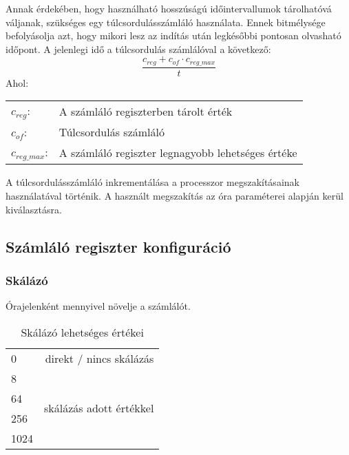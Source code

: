 Annak érdekében, hogy használható hosszúságú időintervallumok tárolhatóvá váljanak, szükséges egy túlcsordulásszámláló használata.
Ennek bitmélysége befolyásolja azt, hogy mikori lesz az indítás után legkésőbbi pontosan olvasható időpont.
A jelenlegi idő a túlcsordulás számlálóval a következő:
\begin{equation}
    \frac{c_{reg} + c_{of} \cdot c_{reg\_max}}{t}
    \label{eq:ido_szamlalokbol}
\end{equation}
Ahol:
\captionsetup[table]{list=no}
\begin{table}[H]
    \begin{tabular}{ll}
    $c_{reg}$:&A számláló regiszterben tárolt érték \\
    $c_{of}$:&Túlcsordulás számláló \\
    $c_{reg\_max}$:&A számláló regiszter legnagyobb lehetséges értéke \\
    \end{tabular}
\end{table}
\captionsetup[table]{list=yes}
A túlcsordulásszámláló inkrementálása a processzor megszakításainak használatával történik.
A használt megszakítás az óra paraméterei alapján kerül kiválasztásra.

\subsection{Számláló regiszter konfiguráció}

\subsubsection*{Skálázó} Órajelenként mennyivel növelje a számlálót.
\begin{table}[H]
    \centering
    \begin{tabular}{|lr|}
    \hline
    \rowcolor{lightgray}
    \multicolumn{2}{|c|}{Lehetséges értékek}                              \\ \hline
    \multicolumn{1}{|l|}{0}    & direkt / nincs skálázás                  \\ \hline
    \multicolumn{1}{|l|}{8}    & \multirow{4}{*}{skálázás adott értékkel} \\ \cline{1-1}
    \multicolumn{1}{|l|}{64}   &                                          \\ \cline{1-1}
    \multicolumn{1}{|l|}{256}  &                                          \\ \cline{1-1}
    \multicolumn{1}{|l|}{1024} &                                          \\ \hline
    \end{tabular}
    \caption{Skálázó lehetséges értékei}
    \label{tab:skalazo_ertekek}
\end{table}

